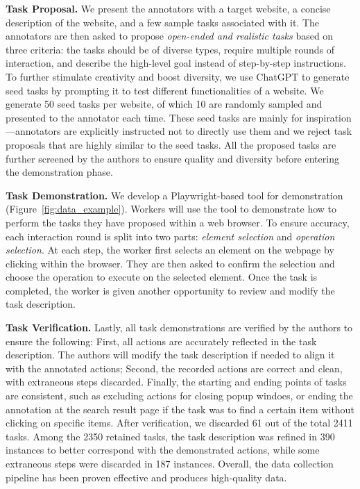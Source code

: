 \noindent\textbf{Task Proposal.}
We present the annotators with a target website, a concise description of the website, and a few sample tasks associated with it.
The annotators are then asked to propose \textit{open-ended and realistic tasks} based on three criteria: the tasks should be of diverse types, require multiple rounds of interaction, and describe the high-level goal instead of step-by-step instructions.
To further stimulate creativity and boost diversity, we use ChatGPT to generate seed tasks by prompting it to test different functionalities of a website.
We generate \num{50} seed tasks per website, of which \num{10} are randomly sampled and presented to the annotator each time.
These seed tasks are mainly for inspiration---annotators are explicitly instructed not to directly use them and we reject task proposals that are highly similar to the seed tasks.
All the proposed tasks are further screened by the authors to ensure quality and diversity before entering the demonstration phase.

\noindent\textbf{Task Demonstration.}
We develop a Playwright-based tool for demonstration (Figure~\ref{fig:data_example}).
Workers will use the tool to demonstrate how to perform the tasks they have proposed within a web browser.
To ensure accuracy, each interaction round is split into two parts: \textit{element selection} and \textit{operation selection}.
At each step, the worker first selects an element on the webpage by clicking within the browser. They are then asked to confirm the selection and choose the operation to execute on the selected element.
Once the task is completed, the worker is given another opportunity to review and modify the task description.

\noindent\textbf{Task Verification.}
Lastly, all task demonstrations are verified by the authors to ensure the following:
First, all actions are accurately reflected in the task description. The authors will modify the task description if needed to align it with the annotated actions;
Second, the recorded actions are correct and clean, with extraneous steps discarded.
Finally, the starting and ending points of tasks are consistent, such as excluding actions for closing popup windoes, or ending the annotation at the search result page if the task was to find a certain item without clicking on specific items.
After verification, we discarded \num{61} out of the total \num{2411} tasks. Among the \num{2350} retained tasks, the task description was refined in \num{390} instances to better correspond with the demonstrated actions, while some extraneous steps were discarded in \num{187} instances. Overall, the data collection pipeline has been proven effective and produces high-quality data.

